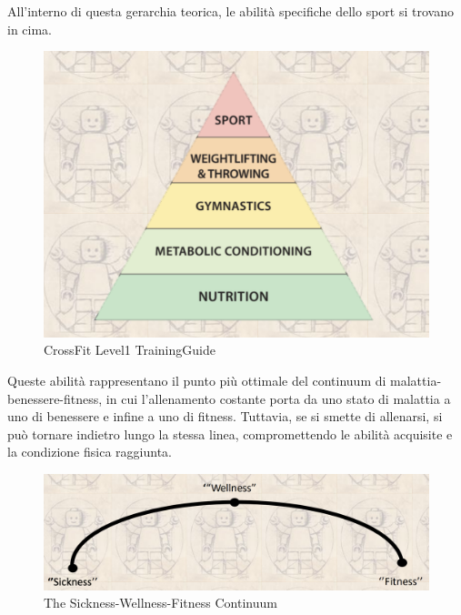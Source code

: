 \documentclass[12pt,oneside,a4paper]{article}
\begin{document}
All'interno di questa gerarchia teorica, le abilità specifiche dello sport si trovano in cima.
\newpage
\begin{figure}[h]
    \centering
    \includegraphics[width=.7\textwidth]{pircross.png}
    \caption{CrossFit Level1 TrainingGuide}
    \label{fig:my_label}
\end{figure}
Queste abilità rappresentano il punto più ottimale del continuum di malattia-benessere-fitness, in cui l'allenamento costante porta da uno stato di malattia a uno di benessere e infine a uno di fitness. Tuttavia, se si smette di allenarsi, si può tornare indietro lungo la stessa linea, compromettendo le abilità acquisite e la condizione fisica raggiunta. 
\begin{figure}[h]
    \centering
    \includegraphics[width=.9\textwidth]{linea.png}
    \caption{The Sickness-Wellness-Fitness Continuum}
    \label{fig:my_label}
\end{figure}
\end{document}
